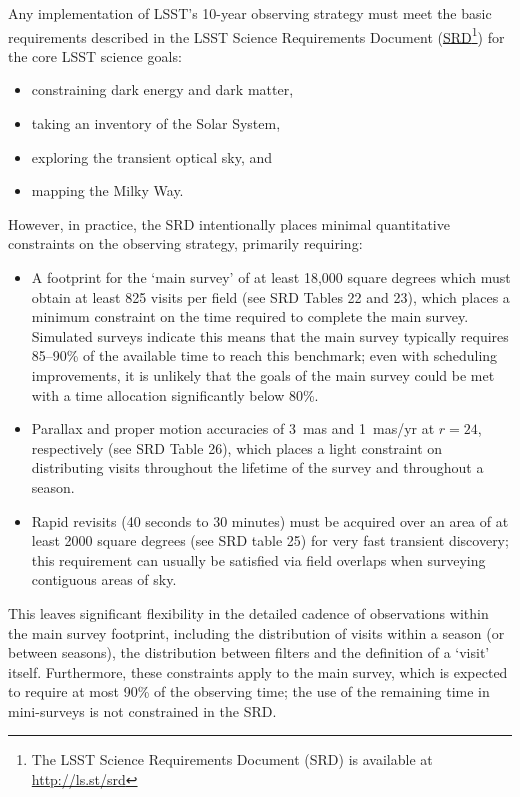 \documentclass[DM,lsstdraft,toc,usenatbib]{lsstdoc}
\begin{document}
Any implementation of LSST's 10-year observing strategy must meet the basic requirements described in the 
LSST Science Requirements Document (\href{http://ls.st/srd}{SRD}\footnote{The LSST Science 
Requirements Document (SRD) is available at \href{http://ls.st/srd}{http://ls.st/srd}})
for the core LSST science goals:
\begin{itemize}
\item constraining dark energy and dark matter,
\item taking an inventory of the Solar System,
\item exploring the transient optical sky, and
\item mapping the Milky Way.
\end{itemize}
However, in practice, the SRD intentionally places minimal quantitative constraints on the observing strategy,
primarily requiring:
\begin{itemize} 
\item A footprint for the `main survey' of at least 18,000 square degrees which must
obtain at least 825 visits per field (see SRD Tables 22 and 23), which places a minimum constraint on the time required to complete 
the main survey. Simulated surveys indicate this means that the main survey typically requires 85--90\% of the available time to 
reach this benchmark; even with scheduling improvements, it is unlikely that the goals of the main survey could be met with a time allocation
significantly below 80\%. 
\item Parallax and proper motion accuracies of 3~mas and 1~mas/yr at $r=24$, respectively (see SRD Table 26), which places
a light constraint on distributing visits throughout the lifetime of the survey and throughout a season.
\item Rapid revisits (40 seconds to 30 minutes) must be acquired over an area of at least 2000 square degrees (see SRD table 25) for
very fast transient discovery; this requirement can usually be satisfied via field overlaps when surveying contiguous areas of sky. 
\end{itemize}
This leaves significant flexibility in the detailed cadence of observations within
the main survey footprint, including the distribution of visits within a season (or between seasons), the distribution between filters and 
the definition of a `visit' itself. Furthermore, these constraints apply to the main survey, which is expected to
require at most 90\% of the observing time; the use of the remaining time in mini-surveys is not constrained in the SRD.
\end{document}
